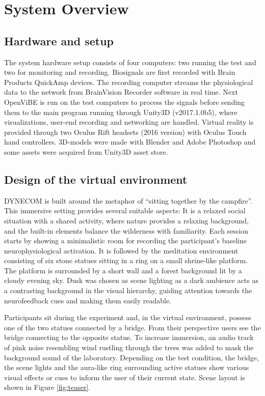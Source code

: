 \documentclass[manuscript, review = false, screen]{acmart}
\begin{document}
\section{System Overview}

\subsection{Hardware and setup}
The system hardware setup consists of four computers: two running the test and two for monitoring and recording. Biosignals are first recorded with Brain Products QuickAmp devices. The recording computer streams the physiological data to the network from BrainVision Recorder software in real time. Next OpenViBE \cite{OpenViBE} is run on the test computers to process the signals before sending them to the main program running through Unity3D (v2017.1.0b5)\cite{Unity3D}, where visualizations, user-end recording and networking are handled. Virtual reality is provided through two Oculus Rift headsets (2016 version) with Oculus Touch hand controllers. 3D-models were made with Blender \cite{Blender} and Adobe Photoshop \cite{Photoshop} and some assets were acquired from Unity3D asset store.

\subsection{Design of the virtual environment}
DYNECOM is built around the metaphor of ``sitting together by the campfire''. This immersive setting provides several suitable aspects: It is a relaxed social situation with a shared activity, where nature provides a relaxing background, and the built-in elements balance the wilderness with familiarity. Each session starts by showing a minimalistic room for recording the participant's baseline neurophysiological activation. It is followed by the meditation environment consisting of six stone statues sitting in a ring on a small shrine-like platform. The platform is surrounded by a short wall and a forest background lit by a cloudy evening sky. Dusk was chosen as scene lighting as a dark ambience acts as a contrasting background in the visual hierarchy, guiding attention towards the neurofeedback cues and making them easily readable.

Participants sit during the experiment and, in the virtual environment, possess one of the two statues connected by a bridge. From their perspective users see the bridge connecting to the opposite statue. To increase immersion, an audio track of pink noise resembling wind rustling through the trees was added to mask the background sound of the laboratory. Depending on the test condition, the bridge, the scene lights and the aura-like ring surrounding active statues show various visual effects or cues to inform the user of their current state. Scene layout is shown in Figure \ref{fig:teaser}.
\end{document}
